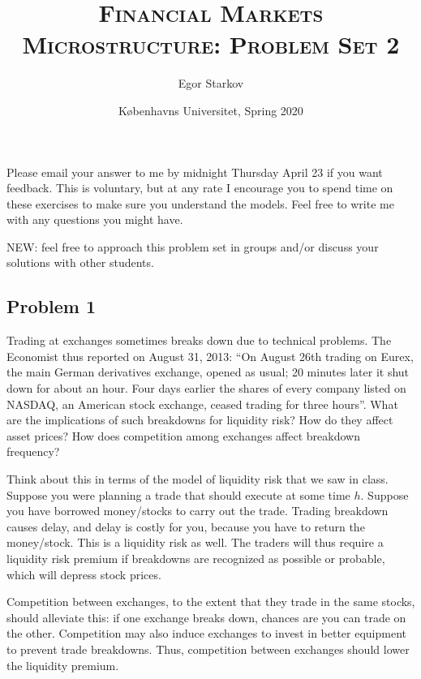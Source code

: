 \documentclass[11pt
, answers
]{exam}
\begin{document}
	
	
\title{\textsc{Financial Markets Microstructure: Problem Set 2}}
\date{K{\o}benhavns Universitet, Spring 2020}
\author{Egor Starkov}


\maketitle


Please email your answer to me by midnight Thursday April 23 if you want feedback. This is voluntary, but at any rate I encourage you to spend time on these exercises to make sure you understand the models. Feel free to write me with any questions you might have.

NEW: feel free to approach this problem set in groups and/or discuss your solutions with other students.

\quad


\subsection*{Problem 1}

Trading at exchanges sometimes breaks down due to technical problems. The Economist thus reported on August 31, 2013: ``On August 26th trading on Eurex, the main German derivatives exchange, opened as usual; 20 minutes later it shut down for about an hour. Four days earlier the shares of every company listed on NASDAQ, an American stock exchange, ceased trading for three hours''. What are the implications of such breakdowns for liquidity risk? How do they affect asset prices? How does competition among exchanges affect breakdown frequency?


\begin{solution}
	Think about this in terms of the model of liquidity risk that we saw in class. Suppose you were planning a trade that should execute at some time $h$. Suppose you have borrowed money/stocks to carry out the trade. Trading breakdown causes delay, and delay is costly for you, because you have to return the money/stock. This is a liquidity risk as well. The traders will thus require a liquidity risk premium if breakdowns are recognized as possible or probable, which will depress stock prices.
	
	Competition between exchanges, to the extent that they trade in the same stocks, should alleviate this: if one exchange breaks down, chances are you can trade on the other. Competition may also induce exchanges to invest in better equipment to prevent trade breakdowns. Thus, competition between exchanges should lower the liquidity premium.
\end{solution}
\end{document}
